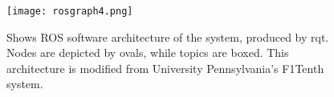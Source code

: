 \documentclass[conference]{IEEEtran}
\begin{document}

\begin{figure}
    \centering
    \texttt{[image: rosgraph4.png]}
    \caption{Shows ROS software architecture of the system, produced by rqt. Nodes are depicted by ovals, while topics are boxed. This architecture is modified from University Pennsylvania's F1Tenth system.}
    \label{Figure 9}
\end{figure}



















\end{document}
